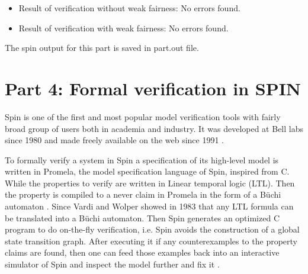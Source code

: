 \documentclass{article}
\begin{document}
\begin{itemize}
\item Result of verification without weak fairness: No errors found.
\item Result of verification with weak fairness: No errors found.
\end{itemize}

The spin output for this part is saved in part.out file.

\section*{Part 4: Formal verification in SPIN}

Spin is one of the first and most popular model verification tools with fairly broad group of users both in academia and industry. It was developed at Bell labs since 1980 and made freely available on the web since 1991 \cite{strunk2006survey}.

To formally verify a system in Spin a specification of its high-level model is written in Promela, the model specification language of Spin, inspired from C. While the properties to verify are written in Linear temporal logic (LTL). Then the property is compiled to a never claim in Promela in the form of a Büchi automaton \cite{frappier2010comparison}. Since Vardi and Wolper showed in 1983 that any LTL formula can be translated into a Büchi automaton. Then Spin generates an optimized C program to do on-the-fly verification, i.e. Spin avoids the construction of a global state transition graph. After executing it if any counterexamples to the property claims are found, then one can feed those examples back into an interactive simulator of Spin and inspect the model further and fix it \cite{holzmann1997model}.



\end{document}
